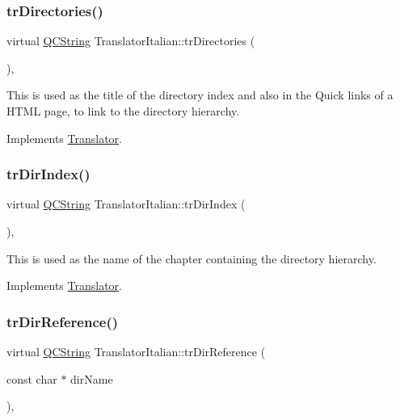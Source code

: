 \subsubsection{\texorpdfstring{trDirectories()}{trDirectories()}}
{\footnotesize\ttfamily virtual \mbox{\hyperlink{class_q_c_string}{Q\+C\+String}} Translator\+Italian\+::tr\+Directories (\begin{DoxyParamCaption}{ }\end{DoxyParamCaption})\hspace{0.3cm}{\ttfamily [inline]}, {\ttfamily [virtual]}}

This is used as the title of the directory index and also in the Quick links of a H\+T\+ML page, to link to the directory hierarchy. 

Implements \mbox{\hyperlink{class_translator}{Translator}}.

\mbox{\label{class_translator_italian_adfc5d01cf997c3c181d84b45f7ad9e45}} 
\subsubsection{\texorpdfstring{trDirIndex()}{trDirIndex()}}
{\footnotesize\ttfamily virtual \mbox{\hyperlink{class_q_c_string}{Q\+C\+String}} Translator\+Italian\+::tr\+Dir\+Index (\begin{DoxyParamCaption}{ }\end{DoxyParamCaption})\hspace{0.3cm}{\ttfamily [inline]}, {\ttfamily [virtual]}}

This is used as the name of the chapter containing the directory hierarchy. 

Implements \mbox{\hyperlink{class_translator}{Translator}}.

\mbox{\label{class_translator_italian_a79749b27a77fa727e3935f1a992cc02b}} 
\subsubsection{\texorpdfstring{trDirReference()}{trDirReference()}}
{\footnotesize\ttfamily virtual \mbox{\hyperlink{class_q_c_string}{Q\+C\+String}} Translator\+Italian\+::tr\+Dir\+Reference (\begin{DoxyParamCaption}\item[{const char $\ast$}]{dir\+Name }\end{DoxyParamCaption})\hspace{0.3cm}{\ttfamily [inline]}, {\ttfamily [virtual]}}

